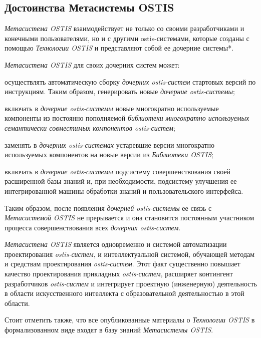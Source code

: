 \subsection{Достоинства Метасистемы OSTIS}

\textit{Метасистема OSTIS} взаимодействует не только со своими разработчиками и конечными пользователями, но и с другими ostis-системами, которые созданы с помощью \textit{Технологии OSTIS} и представляют собой ее дочерние системы*. 

\textit{Метасистема OSTIS} для своих дочерних систем может:
\begin{textitemize}
	\item осуществлять автоматическую сборку \textit{дочерних ostis-систем} стартовых версий по инструкциям. Таким образом, генерировать новые \textit{дочерние ostis-системы};
	\item включать в \textit{дочерние ostis-системы} новые многократно используемые компоненты
	из постоянно пополняемой \textit{библиотеки многократно используемых семантически совместимых компонентов ostis-систем};
	\item заменять в \textit{дочерних ostis-системах} устаревшие версии многократно используемых компонентов на новые версии из \textit{Библиотеки OSTIS};
	\item включать в \textit{дочерние ostis-системы} подсистему совершенствования своей расширенной базы знаний и, при необходимости, подсистему улучшения ее интегрированной машины обработки знаний и пользовательского интерфейса.
\end{textitemize}

Таким образом, после появления \textit{дочерней ostis-системы} ее связь с \textit{Метасистемой OSTIS} не прерывается и она становится постоянным участником процесса совершенствования всех \textit{дочерних ostis-систем}.

\textit{Метасистема OSTIS} является одновременно и системой автоматизации проектирования \textit{ostis-систем}, и интеллектуальной системой, обучающей методам и средствам проектирования \textit{ostis-систем}. Этот факт существенно повышает качество проектирования прикладных \textit{ostis-систем}, расширяет контингент разработчиков \textit{ostis-систем} и интегрирует проектную (инженерную) деятельность в области искусственного интеллекта с образовательной деятельностью в этой области.

Стоит отметить также, что все опубликованные материалы о \textit{Технологии OSTIS} в формализованном виде входят в базу знаний \textit{Метасистемы OSTIS}.


